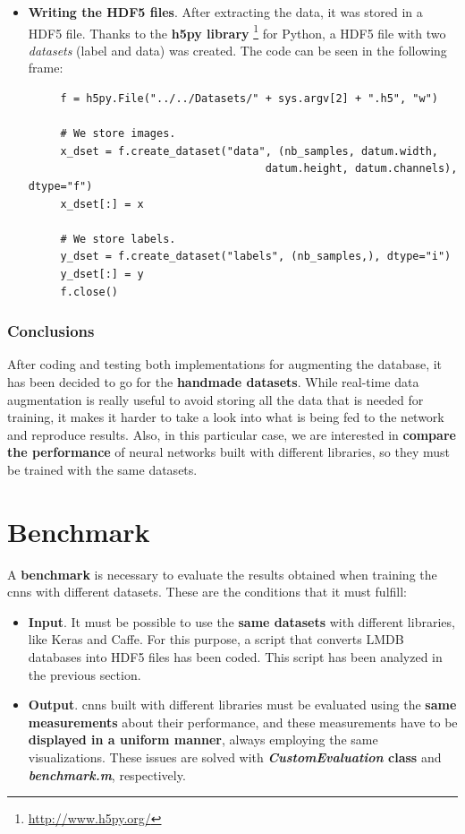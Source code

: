 \begin{itemize}
\begin{lstlisting}
		x.append(im)
		y.append(label)
		nb_samples += 1
		 
		print("Extracted samples: " + str(nb_samples) + "\n")
	 
	x = np.asarray(x)
	y = np.asarray(y)
	\end{lstlisting}

	\item \textbf{Writing the HDF5 files}. After extracting the data, it was stored in a HDF5 file. Thanks to the \textbf{h5py library} \footnote{\url{http://www.h5py.org/}} for Python, a HDF5 file with two \textit{datasets} (label and data) was created. The code can be seen in the following frame:	 
	 \begin{lstlisting}
	 f = h5py.File("../../Datasets/" + sys.argv[2] + ".h5", "w")
	 
	 # We store images.
	 x_dset = f.create_dataset("data", (nb_samples, datum.width,
									 datum.height, datum.channels), dtype="f")
	 x_dset[:] = x
	 
	 # We store labels.
	 y_dset = f.create_dataset("labels", (nb_samples,), dtype="i")
	 y_dset[:] = y
	 f.close()
	 \end{lstlisting}
\end{itemize} 

\subsubsection{Conclusions}
After coding and testing both implementations for augmenting the database, it has been decided to go for the \textbf{handmade datasets}. While real-time data augmentation is really useful to avoid storing all the data that is needed for training, it makes it harder to take a look into what is being fed to the network and reproduce results. Also, in this particular case, we are interested in \textbf{compare the performance} of neural networks built with different libraries, so they must be trained with the same datasets.

\section{Benchmark}\label{sec:bencharmk}
A \textbf{benchmark} is necessary to evaluate the results obtained when training the \glspl{cnn} with different datasets. These are the conditions that it must fulfill:
\begin{itemize}
	\item \textbf{Input}. It must be possible to use the \textbf{same datasets} with different libraries, like Keras and Caffe. For this purpose, a script that converts LMDB databases into HDF5 files has been coded. This script has been analyzed in the previous section.
	\item \textbf{Output}. \glspl{cnn} built with different libraries must be evaluated using the \textbf{same measurements} about their performance, and these measurements have to be \textbf{displayed in a uniform manner}, always employing the same visualizations. These issues are solved with \textbf{\textit{CustomEvaluation} class} and \textbf{\textit{benchmark.m}}, respectively.
\end{itemize}

